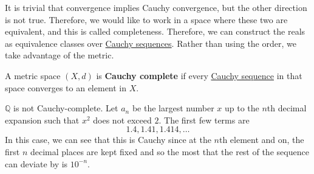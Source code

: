   It is trivial that convergence implies Cauchy convergence, but the other direction is not true. Therefore, we would like to work in a space where these two are equivalent, and this is called completeness. Therefore, we can construct the reals as equivalence classes over \hyperref[def:cauchy-sequence]{Cauchy sequences}. Rather than using the order, we take advantage of the metric. 

  \begin{definition}
    \label{def:cauchy-completeness}
    A metric space $(X, d)$ is \textbf{Cauchy complete} if every \hyperref[def:cauchy-sequence]{Cauchy sequence} in that space converges to an element in $X$. 
  \end{definition} 
  
  $\mathbb{Q}$ is not Cauchy-complete. Let $a_n$ be the largest number $x$ up to the $n$th decimal expansion such that $x^2$ does not exceed $2$. The first few terms are 
  \begin{equation}
    1.4, 1.41, 1.414, \ldots
  \end{equation}
  In this case, we can see that this is Cauchy since at the $n$th element and on, the first $n$ decimal places are kept fixed and so the most that the rest of the sequence can deviate by is $10^{-n}$. 

